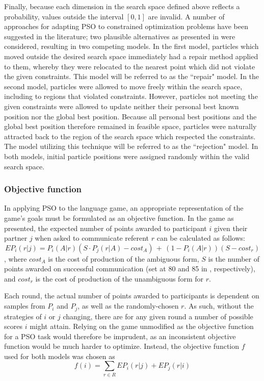 \documentclass[12pt,a4paper]{article}
\begin{document}
Finally, because each dimension in the search space defined above reflects a probability, values outside the interval $[0, 1]$ are invalid. A number of approaches for adapting PSO to constrained optimization problems have been suggested in the literature; two plausible alternatives as presented in \cite{engelbrecht2005} were considered, resulting in two competing models. 
In the first model, particles which moved outside the desired search space immediately had a repair method applied to them, whereby they were relocated to the nearest point which did not violate the given constraints. This model will be referred to as the ``repair" model. In the second model, particles were allowed to move freely within the search space, including to regions that violated constraints. However, particles not meeting the given constraints were allowed to update neither their personal best known position nor the global best position. Because all personal best positions and the global best position therefore remained in feasible space, particles were naturally attracted back to the region of the search space which respected the constraints. The model utilizing this technique will be referred to as the ``rejection" model. In both models, initial particle positions were assigned randomly within the valid search space.


 
\subsubsection{Objective function}
In applying PSO to the \citeauthor{rohde2012} language game, an appropriate representation of the game's goals must be formulated as an objective function. In the game as presented, the expected number of points awarded to participant $i$ given their partner $j$ when asked to communicate referent $r$ can be calculated as follows:
\begin{equation}
EP_{i}(r|j) = P_i(A|r)(S \cdot P_j(r|A) - cost_A) \,+\, (1 - P_i(A|r))(S - cost_r) 
\end{equation},
where $cost_A$ is the cost of production of the ambiguous form, $S$ is the number of points awarded on successful communication (set at 80 and 85 in \citeauthor{rohde2012}, respectively), and $cost_r$ is the cost of production of the unambiguous form for $r$.

Each round, the actual number of points awarded to participants is dependent on samples from $P_i$ and $P_j$, as well as the randomly-chosen $r$. As such, without the strategies of $i$ or $j$ changing, there are for any given round a number of possible scores $i$ might attain. Relying on the game unmodified as the objective function for a PSO task would therefore be imprudent, as an inconsistent objective function would be much harder to optimize. Instead, the objective function $f$ used for both models was chosen as 
\begin{equation}
f(i) = \sum_{r \in R} EP_{i}(r|j) + EP_{j}(r|i)
\end{equation}
\end{document}
